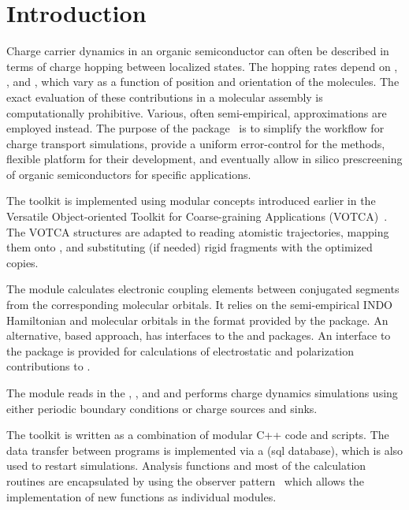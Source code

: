 \chapter{Introduction}
\label{sec:introduction}

Charge carrier dynamics in an organic semiconductor can often be described in terms of charge hopping between localized states. The hopping rates depend on , , and , which vary as a function of position and orientation of the molecules.  The exact evaluation of these contributions in a molecular assembly is computationally prohibitive. Various, often semi-empirical, approximations are employed instead. The purpose of the \votcactp package~\cite{ruehle_microscopic_2011} is to simplify the workflow for charge transport simulations, provide a uniform error-control for the methods, flexible platform for their development, and eventually allow in silico prescreening of organic semiconductors for specific applications. 

The toolkit is implemented using modular concepts introduced earlier in the Versatile Object-oriented Toolkit for Coarse-graining Applications (VOTCA)~\cite{ruehle_versatile_2009}. The VOTCA structures are adapted to reading atomistic trajectories, mapping them onto , and substituting (if needed) rigid fragments with the optimized copies. 

The  module calculates electronic coupling elements between  conjugated segments from the corresponding molecular orbitals. It relies on the semi-empirical INDO Hamiltonian and molecular orbitals in the format provided by the \gaussian package. An alternative,   based approach, has interfaces to the \gaussian and \turbomole packages. An interface to the \tinker package is provided for calculations of electrostatic and polarization contributions to . 

The   module reads in the , , and  and performs charge dynamics simulations using either periodic boundary conditions or charge sources and sinks. 

The toolkit is written as a combination of modular C++ code and scripts. The data transfer between programs is implemented via a  (sql database), which is also used to restart simulations. Analysis functions and most of the calculation routines are encapsulated by using the observer pattern~\cite{gamma_design_1995} which allows the implementation of new functions as individual modules.